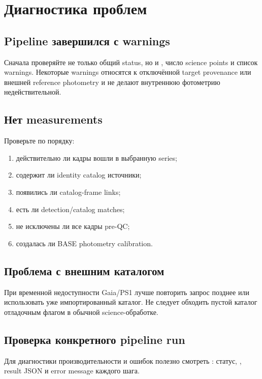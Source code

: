 \chapter{Диагностика проблем}

\section{Pipeline завершился с warnings}

Сначала проверяйте не только общий status, но и , число science points и список warnings. Некоторые warnings относятся к отключённой target provenance или внешней reference photometry и не делают внутреннюю фотометрию недействительной.

\section{Нет measurements}

Проверьте по порядку:

\begin{enumerate}
  \item действительно ли кадры вошли в выбранную series;
  \item содержит ли identity catalog источники;
  \item появились ли catalog-frame links;
  \item есть ли detection/catalog matches;
  \item не исключены ли все кадры pre-QC;
  \item создалась ли BASE photometry calibration.
\end{enumerate}

\section{Проблема с внешним каталогом}

При временной недоступности Gaia/PS1 лучше повторить запрос позднее или использовать уже импортированный каталог. Не следует обходить пустой каталог отладочным флагом в обычной science-обработке.

\section{Проверка конкретного pipeline run}

Для диагностики производительности и ошибок полезно смотреть : статус, , result JSON и error message каждого шага.


